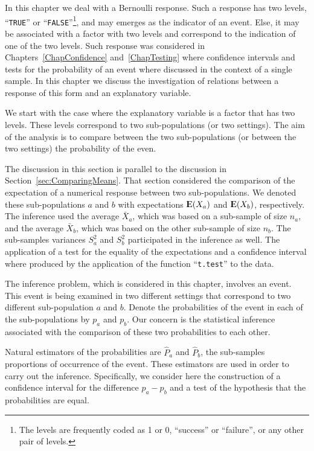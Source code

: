 \documentclass[]{krantz}
\newcommand{\Expec}{{\rm I\kern-.3em E}}
\theoremstyle{definition}
\theoremstyle{definition}
\theoremstyle{definition}
\theoremstyle{remark}
\begin{document}
In this chapter we deal with a Bernoulli response. Such a response has
two levels, ``\texttt{TRUE}'' or ``\texttt{FALSE}''\footnote{The levels
  are frequently coded as 1 or 0, ``success'' or ``failure'', or any
  other pair of levels.}, and may emerges as the indicator of an event.
Else, it may be associated with a factor with two levels and correspond
to the indication of one of the two levels. Such response was considered
in Chapters~\ref{ChapConfidence} and~\ref{ChapTesting} where confidence
intervals and tests for the probability of an event where discussed in
the context of a single sample. In this chapter we discuss the
investigation of relations between a response of this form and an
explanatory variable.

We start with the case where the explanatory variable is a factor that
has two levels. These levels correspond to two sub-populations (or two
settings). The aim of the analysis is to compare between the two
sub-populations (or between the two settings) the probability of the
even.

The discussion in this section is parallel to the discussion in
Section~\ref{sec:ComparingMeans}. That section considered the comparison
of the expectation of a numerical response between two sub-populations.
We denoted these sub-populations \(a\) and \(b\) with expectations
\(\Expec(X_a)\) and \(\Expec(X_b)\), respectively. The inference used
the average \(\bar X_a\), which was based on a sub-sample of size
\(n_a\), and the average \(\bar X_b\), which was based on the other
sub-sample of size \(n_b\). The sub-samples variances \(S^2_a\) and
\(S^2_b\) participated in the inference as well. The application of a
test for the equality of the expectations and a confidence interval
where produced by the application of the function ``\texttt{t.test}'' to
the data.

The inference problem, which is considered in this chapter, involves an
event. This event is being examined in two different settings that
correspond to two different sub-population \(a\) and \(b\). Denote the
probabilities of the event in each of the sub-populations by \(p_a\) and
\(p_b\). Our concern is the statistical inference associated with the
comparison of these two probabilities to each other.

Natural estimators of the probabilities are \(\hat P_a\) and
\(\hat P_b\), the sub-samples proportions of occurrence of the event.
These estimators are used in order to carry out the inference.
Specifically, we consider here the construction of a confidence interval
for the difference \(p_a - p_b\) and a test of the hypothesis that the
probabilities are equal.
\end{document}
